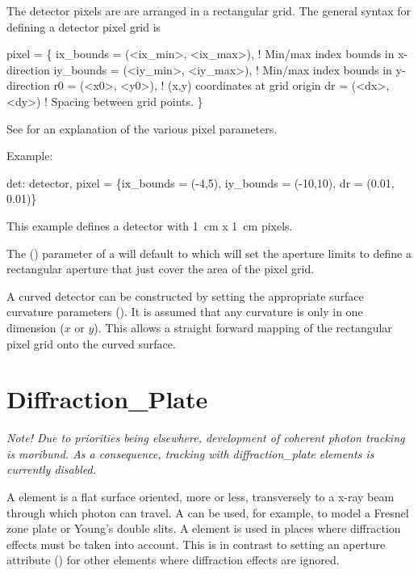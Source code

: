 The detector pixels are are arranged in a rectangular grid. The general syntax for defining
a detector pixel grid is
\begin{example}
  pixel = \{
      ix_bounds = (<ix_min>, <ix_max>),  ! Min/max index bounds in x-direction
      iy_bounds = (<iy_min>, <iy_max>),  ! Min/max index bounds in y-direction
      r0 = (<x0>, <y0>),                 ! (x,y) coordinates at grid origin
      dr = (<dx>, <dy>)                  ! Spacing between grid points.
          \}
\end{example}
See  for an explanation of the various pixel parameters.

Example:
\begin{example}
  det: detector, pixel = 
          \{ix_bounds = (-4,5), iy_bounds = (-10,10), dr = (0.01, 0.01)\}
\end{example}
This example defines a detector with 1~cm x 1~cm pixels.

The  () parameter of a  will default to  which
will set the aperture limits to define a rectangular aperture that just cover the area of the pixel
grid.

A curved detector can be constructed by setting the appropriate surface curvature parameters
(). It is assumed that any curvature is only in one dimension ($x$ or $y$). This
allows a straight forward mapping of the rectangular pixel grid onto the curved surface.

\newpage

\section{Diffraction_Plate}
\label{s:diff.plate}

{\em Note! Due to priorities being elsewhere, development of coherent photon tracking is moribund.
As a consequence, tracking with diffraction_plate elements is currently disabled.}

A  element is a flat surface oriented, more or
less, transversely to a x-ray beam through which photon can travel. A
 can be used, for example, to model a Fresnel
zone plate or Young's double slits. A  element
is used in places where diffraction effects must be taken into
account. This is in contrast to setting an aperture attribute
() for other elements where diffraction effects are
ignored.

